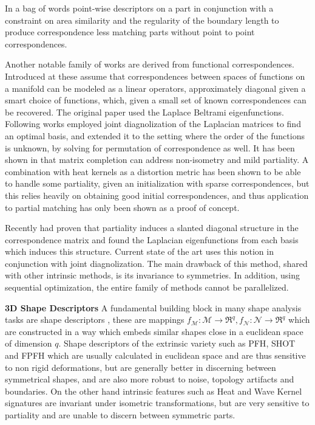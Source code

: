 \documentclass[10pt,twocolumn,letterpaper]{article}
\begin{document}
In\cite{pokrass2013partial} a bag of words point-wise descriptors on a part in conjunction with a constraint on area similarity and the regularity of the boundary length to produce correspondence less matching parts without point to point correspondences.

Another notable family of works are derived from functional correspondences. Introduced at\cite{Ovsjanikov:2012:FMF:2185520.2185526} these assume that correspondences between spaces of functions on a manifold can be modeled as a linear operators, approximately diagonal given a smart choice of functions, which, given a small set of known correspondences can be recovered. The original paper used the Laplace Beltrami eigenfunctions. Following works employed joint diagnolization of the Laplacian matrices to find an optimal basis, and\cite{pokrass2013sparse} extended it to the setting where the order of the functions is unknown, by solving for permutation of correspondence as well. It has been shown in \cite{kovnatsky2015functional} that matrix completion can address non-isometry and mild partiality. A combination with heat kernels as a distortion metric\cite{vestner2017efficient} has been shown to be able to handle some partiality, given an initialization with sparse correspondences, but this relies heavily on obtaining good initial correspondences, and thus application to partial matching has only been shown as a proof of concept.

Recently \cite{rodola2017partial} had proven that partiality induces a slanted diagonal structure in the correspondence matrix and found the Laplacian eigenfunctions from each basis which induces this structure. Current state of the art\cite{litany2017fully} uses this notion in conjunction with joint diagnolization. The main drawback of this method, shared with other intrinsic methods, is its invariance to symmetries. In addition, using sequential optimization, the entire family of methods cannot be parallelized. 

\textbf{3D Shape Descriptors} 
A fundamental building block in many shape analysis tasks are shape descriptors , these are mappings  $f_\mathcal{M}:\mathcal{M}\rightarrow\Re^q,f_\mathcal{N}:\mathcal{N}\rightarrow\Re^q$ which are constructed in a way which embeds similar shapes close in a euclidean space of dimension $q$. 
Shape descriptors of the extrinsic variety such as PFH\cite{rusu2008learning}, SHOT and FPFH\cite{rusu2009fast} which are usually calculated in euclidean space and are thus sensitive to non rigid deformations, but are generally better in discerning between symmetrical shapes, and are also more robust to noise, topology artifacts and boundaries. 
On the other hand intrinsic features such as Heat\cite{bronstein2010scale} and Wave Kernel signatures\cite{aubry2011wave} are invariant under isometric transformations, but are very sensitive to partiality and are unable to discern between symmetric parts.
\end{document}
